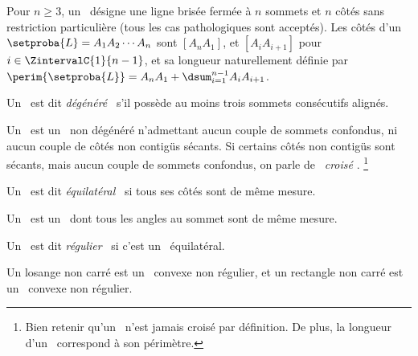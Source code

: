 \begin{defi}
	Pour $n \geq 3$, un \og \emph{\ncycle} \fg\ désigne une ligne brisée fermée à $n$ sommets et $n$ côtés sans restriction particulière (tous les cas pathologiques sont acceptés).
	Les côtés d'un \ncycle\ $\setproba{L} = A_1 A_2 \cdots A_n$ sont $[A_n A_1]$, et $[A_i A_{i+1}]$ pour $i \in \ZintervalC{1}{n-1}$,
	et sa longueur naturellement définie par $\perim{\setproba{L}} = A_n A_1 + \dsum_{i=1}^{n-1} A_i A_{i+1}$. 
\end{defi}


\begin{defi}
	Un \ncycle\ est dit \og \emph{dégénéré} \fg\ s'il possède au moins trois sommets consécutifs alignés.
\end{defi}


\begin{defi}
	Un \og \emph{\ngone} \fg\ est un \ncycle\ non dégénéré n'admettant aucun couple de sommets confondus, ni aucun couple de côtés non contigüs sécants.
	Si certains côtés non contigüs sont sécants, mais aucun couple de sommets confondus, on parle de \og \emph{\ngone\ croisé} \fg.%
	\footnote{
		Bien retenir qu'un \ngone\ n'est jamais croisé par définition.
		De plus, la longueur d'un \ngone\ correspond à son périmètre.
	}
\end{defi}


\begin{defi}
	Un \ngone\ est dit \og \emph{équilatéral} \fg\ si tous ses côtés sont de même mesure.
\end{defi}


\begin{defi}
	Un \og \emph{\niso} \fg\ est un \ngone\ dont tous les angles au sommet sont de même mesure.
\end{defi}


\begin{defi}
	Un \ngone\ est dit \og \emph{régulier} \fg\ si c'est un \niso\ équilatéral.
\end{defi}


\begin{remark}
	Un losange non carré est un \nequi\ convexe non régulier, et un rectangle non carré est un \niso\ convexe non régulier.
\end{remark}
